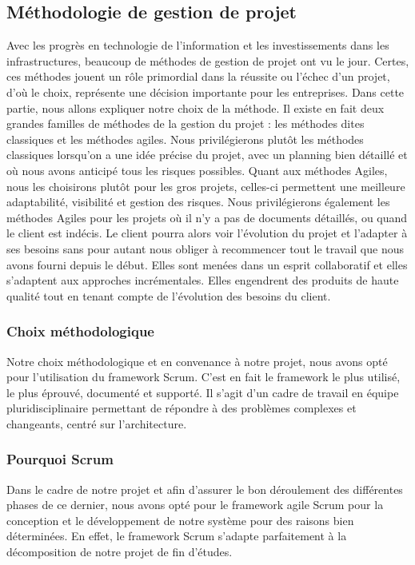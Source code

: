 \subsection{Méthodologie de gestion de projet}
Avec les progrès en technologie de l'information et les investissements dans les infrastructures, beaucoup de méthodes de gestion de projet ont vu le jour. Certes, ces méthodes jouent un rôle primordial dans la réussite ou l'échec d'un projet, d'où le choix, représente une décision importante pour les entreprises. Dans cette partie, nous allons expliquer notre choix de la méthode. Il existe en fait deux grandes familles de méthodes de la gestion du projet : les méthodes dites classiques et les méthodes agiles. Nous privilégierons plutôt les méthodes classiques lorsqu'on a une idée précise du projet, avec un planning bien détaillé et où nous avons anticipé tous les risques possibles. Quant aux méthodes Agiles, nous les choisirons plutôt pour les gros projets, celles-ci permettent une meilleure adaptabilité, visibilité et gestion des risques. Nous privilégierons également les méthodes Agiles pour les projets où il n'y a pas de documents détaillés, ou quand le client est indécis. Le client pourra alors voir l'évolution du projet et l'adapter à ses besoins sans pour autant nous obliger à recommencer tout le travail que nous avons fourni depuis le début. Elles sont menées dans un esprit collaboratif et elles s'adaptent aux approches incrémentales. Elles engendrent des produits de haute qualité tout en tenant compte de l'évolution des besoins du client.

\subsubsection{Choix méthodologique}
Notre choix méthodologique et en convenance à notre projet, nous avons opté pour l'utilisation du framework Scrum. C'est en fait le framework le plus utilisé, le plus éprouvé, documenté et supporté. Il s'agit d'un cadre de travail en équipe pluridisciplinaire permettant de répondre à des problèmes complexes et changeants, centré sur l'architecture.
\subsubsection{Pourquoi Scrum}
Dans le cadre de notre projet et afin d'assurer le bon déroulement des différentes phases de ce dernier, nous avons opté pour le framework agile Scrum pour la conception et le développement de notre système pour des raisons bien déterminées. En effet, le framework Scrum s'adapte parfaitement à la décomposition de notre projet de fin d'études.

